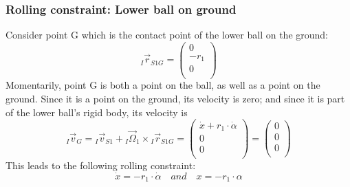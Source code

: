 \documentclass{article}
\begin{document}
\subsubsection{Rolling constraint: Lower ball on ground}
Consider point G which is the contact point of the lower ball on the ground:
\begin{equation}
{}_I \vec{r}_{S1G} = 
\left( {\begin{array}{c} 0 \\ -r_1 \\ 0 \\ \end{array} } \right)
\end{equation}
Momentarily, point G is both a point on the ball, as well as a point on the ground.
Since it is a point on the ground, its velocity is zero; and since it is part of the lower ball's rigid body, its velocity is
\begin{equation}
{}_I \vec{v}_{G} = {}_I \vec{v}_{S1} + {}_I \vec{\Omega}_1 \times {}_I \vec{r}_{S1G} =
\left( {\begin{array}{c} \dot{x} + r_1 \cdot \dot{\alpha} \\ 0 \\ 0 \\ \end{array} } \right) =
\left( {\begin{array}{c} 0 \\ 0 \\ 0 \\ \end{array} } \right)
\end{equation}
This leads to the following rolling constraint:
\begin{equation}
\dot{x} = -r_1 \cdot \dot{\alpha} \quad and \quad x = -r_1 \cdot \alpha
\end{equation}
\end{document}
